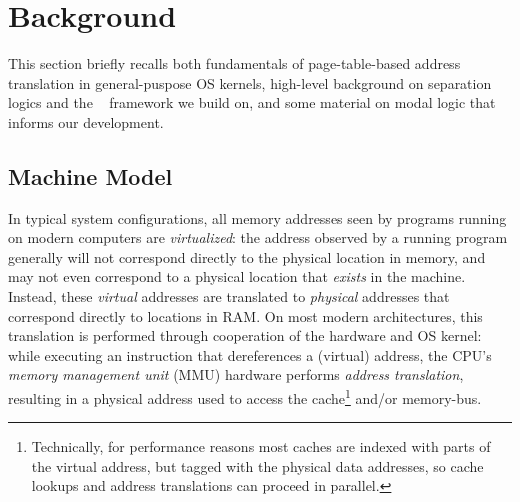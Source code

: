 \section{Background}
\label{sec:background}
This section briefly recalls both fundamentals of page-table-based address translation in
general-puspose OS kernels, 
high-level background on separation logics and the \iris~\cite{jung2018iris} framework
we build on,
and some material on modal logic that informs our development.

\subsection{Machine Model}
\label{sec:backgroundonmachinemodel}

In typical system configurations, all memory addresses seen by programs running on modern computers are \emph{virtualized}: the address observed by a running
program generally will not correspond directly to the physical location in memory, and may not even correspond to a physical location that \emph{exists} 
in the machine. Instead, these \emph{virtual} addresses are translated to \emph{physical} addresses that correspond directly to locations in RAM. On most 
modern architectures, this translation is performed through cooperation of the hardware and OS kernel: while executing an instruction that dereferences a 
(virtual) address, the CPU's \emph{memory management unit} (\textsc{MMU}) hardware performs \emph{address translation},
resulting in a physical address used to access the cache\footnote{Technically, for performance reasons most caches are indexed with parts of the virtual 
address, but tagged with the physical data addresses, so cache lookups and address translations can proceed in parallel.} and/or memory-bus.
\setlength{\columnseprule}{4pt}

